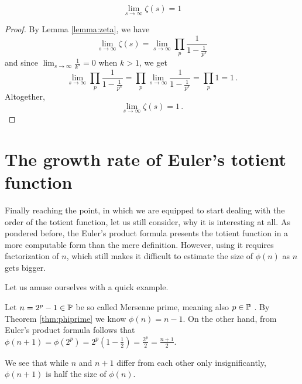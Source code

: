 \documentclass{article}
\begin{document}
\begin{lemma}
\label{lemma:zetalim}
\begin{equation*}
    \lim_{s\rightarrow\infty} \zeta(s) = 1
\end{equation*}

\begin{proof}
By Lemma \ref{lemma:zeta}, we have
\begin{equation*}
    \lim_{s\rightarrow\infty} \zeta(s) = \lim_{s\rightarrow\infty} \prod_p \frac{1}{1-\frac{1}{p^s}}
\end{equation*}
and since $\lim_{s\rightarrow\infty}\frac{1}{k^s}=0$ when $k>1$, we get
\begin{equation*}
    \lim_{s\rightarrow\infty} \prod_p \frac{1}{1-\frac{1}{p^s}} = \prod_p \lim_{s\rightarrow\infty} \frac{1}{1-\frac{1}{p^s}} = \prod_p 1 = 1\,.
\end{equation*}
Altogether,
\begin{equation*}
    \lim_{s\rightarrow\infty} \zeta(s) = 1\,.
\end{equation*}
\end{proof}
\end{lemma}

\section{The growth rate of Euler's totient function}

Finally reaching the point, in which we are equipped to start dealing with the order of the totient function, let us still consider, why it is interesting at all. As pondered before, the Euler's product formula presents the totient function in a more computable form than the mere definition. However, using it requires factorization of $n$, which still makes it difficult to estimate the size of $\phi(n)$ as $n$ gets bigger.

Let us amuse ourselves with a quick example.

\begin{example}
Let $n = 2^p - 1 \in \mathbb{P}$ be so called Mersenne prime, meaning also $p \in \mathbb{P}$ \emph{\cite{Pomerance}}. By Theorem \ref{thm:phiprime} we know $\phi(n) = n - 1$. On the other hand, from Euler's product formula follows that $\phi(n+1) = \phi(2^p) = 2^p(1-\frac{1}{2}) = \frac{2^p}{2} = \frac{n+1}{2}$.

We see that while $n$ and $n+1$ differ from each other only insignificantly, $\phi(n+1)$ is half the size of $\phi(n)$.
\end{example}
\end{document}
